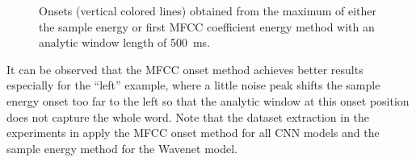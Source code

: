\begin{figure}[!ht]
  \centering
  \caption{Onsets (vertical colored lines) obtained from the maximum of either the sample energy or first MFCC coefficient energy method with an analytic window length of \SI{500}{\milli\second}.}
  \label{fig:signal_onset_showcase}
\end{figure}
\FloatBarrier
\noindent
It can be observed that the MFCC onset method achieves better results especially for the \enquote{left} example, where a little noise peak shifts the sample energy onset too far to the left so that the analytic window at this onset position does not capture the whole word.
Note that the dataset extraction in the experiments in  apply the MFCC onset method for all CNN models and the sample energy method for the Wavenet model.


